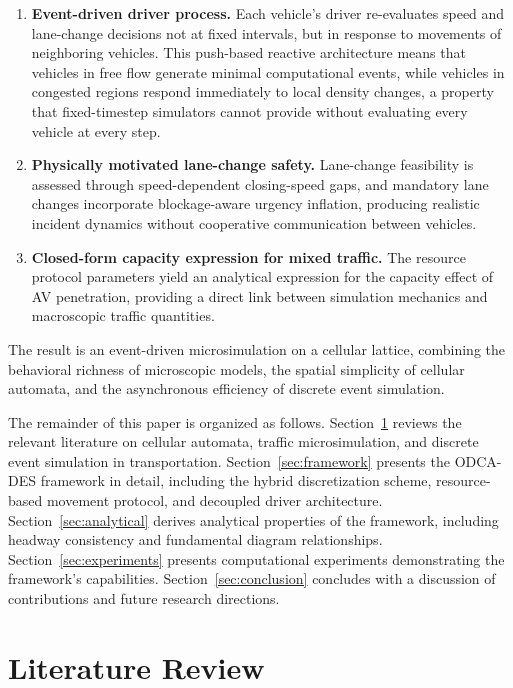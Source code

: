 \documentclass[review,number]{elsarticle}
\begin{document}
\begin{enumerate}
    \item \textbf{Event-driven driver process.} Each vehicle's driver re-evaluates speed and lane-change decisions not at fixed intervals, but in response to movements of neighboring vehicles. This push-based reactive architecture means that vehicles in free flow generate minimal computational events, while vehicles in congested regions respond immediately to local density changes, a property that fixed-timestep simulators cannot provide without evaluating every vehicle at every step.

    \item \textbf{Physically motivated lane-change safety.} Lane-change feasibility is assessed through speed-dependent closing-speed gaps, and mandatory lane changes incorporate blockage-aware urgency inflation, producing realistic incident dynamics without cooperative communication between vehicles.

    \item \textbf{Closed-form capacity expression for mixed traffic.} The resource protocol parameters yield an analytical expression for the capacity effect of AV penetration, providing a direct link between simulation mechanics and macroscopic traffic quantities.
\end{enumerate}

The result is an event-driven microsimulation on a cellular lattice, combining the behavioral richness of microscopic models, the spatial simplicity of cellular automata, and the asynchronous efficiency of discrete event simulation.

The remainder of this paper is organized as follows. Section~\ref{sec:literature} reviews the relevant literature on cellular automata, traffic microsimulation, and discrete event simulation in transportation. Section~\ref{sec:framework} presents the ODCA-DES framework in detail, including the hybrid discretization scheme, resource-based movement protocol, and decoupled driver architecture. Section~\ref{sec:analytical} derives analytical properties of the framework, including headway consistency and fundamental diagram relationships. Section~\ref{sec:experiments} presents computational experiments demonstrating the framework's capabilities. Section~\ref{sec:conclusion} concludes with a discussion of contributions and future research directions.


\section{Literature Review}
\label{sec:literature}
\end{document}
